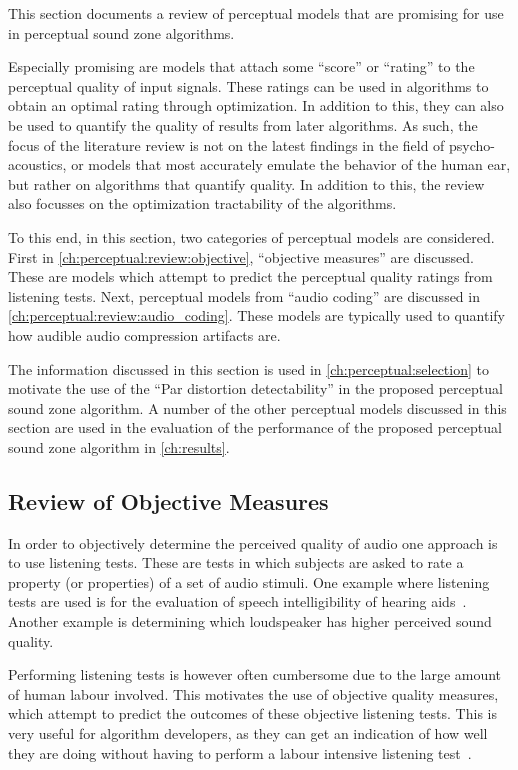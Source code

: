This section documents a review of perceptual models that are promising for use in perceptual sound zone
algorithms.

Especially promising are models that attach some ``score'' or ``rating'' to the perceptual quality of input signals.
These ratings can be used in algorithms to obtain an optimal rating through optimization.
In addition to this, they can also be used to quantify the quality of results from later algorithms.
As such, the focus of the literature review is not on the latest findings in the field of psycho-acoustics, or models 
that most accurately emulate the behavior of the human ear, but rather on algorithms that quantify quality.
In addition to this, the review also focusses on the optimization tractability of the algorithms.

To this end, in this section, two categories of perceptual models are considered.
First in \autoref{ch:perceptual:review:objective}, ``objective measures'' are discussed.
These are models which attempt to predict the perceptual quality ratings from listening tests. 
Next, perceptual models from ``audio coding'' are discussed in \autoref{ch:perceptual:review:audio_coding}.
These models are typically used to quantify how audible audio compression artifacts are.

The information discussed in this section is used in \autoref{ch:perceptual:selection} to motivate the use of the 
``Par distortion detectability'' in the proposed perceptual sound zone algorithm.
A number of the other perceptual models discussed in this section are used in the evaluation of the 
performance of the proposed perceptual sound zone algorithm in \autoref{ch:results}.

\subsection{Review of Objective Measures}
\label{ch:perceptual:review:objective}
In order to objectively determine the perceived quality of audio one approach is to use listening tests.
These are tests in which subjects are asked to rate a property (or properties) of a set of audio stimuli.
One example where listening tests are used is for the evaluation of speech 
intelligibility of hearing aids~\cite{taal2011algorithm}.
Another example is determining which loudspeaker has higher perceived sound quality.

Performing listening tests is however often cumbersome due to the large amount of human labour involved.
This motivates the use of objective quality measures, which attempt to predict the outcomes of these objective listening tests.
This is very useful for algorithm developers, as they can get an indication of how well they are doing
without having to perform a labour intensive listening test~\cite{taal2011algorithm}.

